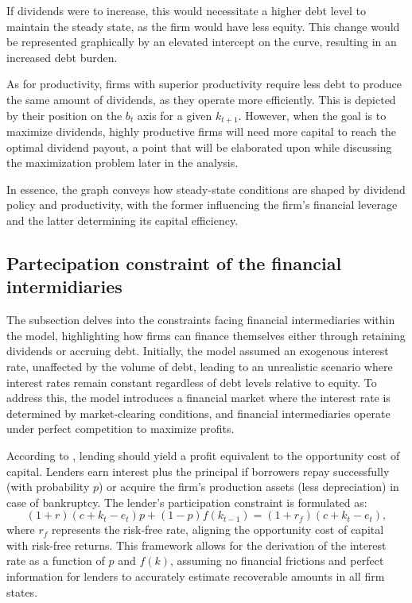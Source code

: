 \documentclass[12pt]{article}
\begin{document}
If dividends were to increase, this would necessitate a higher debt level to maintain the steady state, as the firm
would have less equity. This change would be represented graphically by an elevated intercept on the curve, resulting in
an increased debt burden. 

As for productivity, firms with superior productivity require less debt to produce the same amount of dividends, as they
operate more efficiently. This is depicted by their position on the \(b_t\) axis for a given \(k_{t+1}\). However, when
the goal is to maximize dividends, highly productive firms will need more capital to reach the optimal dividend payout,
a point that will be elaborated upon while discussing the maximization problem later in the analysis. 

In essence, the graph conveys how steady-state conditions are shaped by dividend policy and productivity, with the
former influencing the firm's financial leverage and the latter determining its capital efficiency. 


\subsection{Partecipation constraint of the financial intermidiaries }
The subsection delves into the constraints facing financial intermediaries within the model, highlighting how firms can
finance themselves either through retaining dividends or accruing debt. Initially, the model assumed an exogenous
interest rate, unaffected by the volume of debt, leading to an unrealistic scenario where interest rates remain constant
regardless of debt levels relative to equity. To address this, the model introduces a financial market where the
interest rate is determined by market-clearing conditions, and financial intermediaries operate under perfect
competition to maximize  profits.

According to \cite{BerGer86}, lending should yield a profit equivalent to the opportunity cost of capital. Lenders earn
interest  plus the principal if borrowers repay successfully (with probability \(p\)) or acquire the firm's production
assets (less depreciation) in case of bankruptcy. The lender's participation constraint is formulated as:
\[
(1+r)(c+k_t -e_t)p + (1-p)f(k_{t-1}) = (1+r_f)(c+k_t -e_t),
\]
where \(r_f\) represents the risk-free rate, aligning the opportunity cost of capital with risk-free returns. This
framework allows for  the derivation of the interest rate as a function of \(p\) and \(f(k)\), assuming no financial
frictions and perfect information for lenders to accurately estimate recoverable amounts in all firm states.
\end{document}
